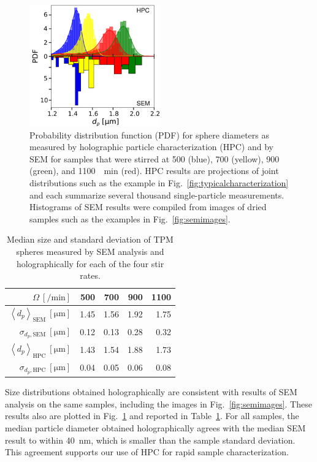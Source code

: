 \documentclass[journal=langd5,manuscript=article]{achemso}
\newcommand{\avg}[1]{\left< #1 \right>}
\begin{document}
\begin{figure}[!t]
  \centering
  \includegraphics[width=0.5\textwidth]{sizedistributions03}
  \caption{Probability distribution function (PDF) for 
    sphere diameters as measured by
    holographic particle characterization (HPC) and by SEM for
    samples that were stirred at 
    \num{500} (blue), 
    \num{700} (yellow), 
    \num{900} (green), 
    and \SI{1100}{\per\minute} (red).
    HPC results are projections of joint
    distributions such as the example in
    Fig.~\ref{fig:typicalcharacterization}
    and each summarize several thousand single-particle measurements.
    Histograms of SEM results were compiled from
    images of dried samples such as the
    examples in Fig.~\ref{fig:semimages}.}
  \label{fig:sizedistribution}
\end{figure}


\begin{table}[!h]
\centering
\caption{Median size and standard deviation of TPM spheres
  measured by SEM analysis 
  and holographically for each of the four stir rates.}
\begin{tabular}{rrrrr}
\hline
\hline
$\Omega~[\si{\per\minute}]$ & \num{500} & \num{700}& \num{900} & \num{1100} \\
\hline
$\avg{d_p}_{\text{SEM}}~[\si{\um}]$ & 1.45 & 1.56 & 1.92 & 1.75 \\ 
$\sigma_{d_p, \text{SEM}}~[\si{\um}]$ & 0.12 & 0.13 & 0.28 & 0.32 \\ 
$\avg{d_p}_{\text{HPC}}~[\si{\um}]$ & 1.43 & 1.54 & 1.88 & 1.73 \\ 
$\sigma_{d_p, \text{HPC}}~[\si{\um}]$ & 0.04 & 0.05 & 0.06 & 0.08 \\ 
\hline \hline
\end{tabular}
\label{table:sem_data}
\end{table}

Size distributions obtained holographically are consistent with results of SEM analysis on the same samples, including
the images in Fig.~\ref{fig:semimages}.
These results
also are plotted in Fig.~\ref{fig:sizedistribution}
and reported in Table~\ref{table:sem_data}.
For all samples, the median particle diameter
obtained holographically agrees with the median
SEM result to within \SI{40}{\nm}, which is smaller
than the sample standard deviation.
This agreement supports our use of HPC for rapid
sample characterization.
\end{document}
